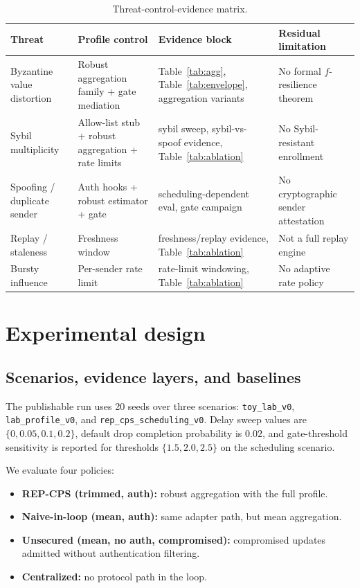 \documentclass[11pt]{article}
\newcommand{\repcps}{REP-CPS}
\newcommand{\code}[1]{\texttt{#1}}
\begin{document}
\begin{table}[H]
\centering
\caption{Threat-control-evidence matrix.}
\label{tab:threats}
\begin{tabularx}{\linewidth}{p{2.5cm}p{3.0cm}p{4.0cm}X}
\toprule
Threat & Profile control & Evidence block & Residual limitation \\
\midrule
Byzantine value distortion & Robust aggregation family + gate mediation & Table~\ref{tab:agg}, Table~\ref{tab:envelope}, aggregation variants & No formal $f$-resilience theorem \\
Sybil multiplicity & Allow-list stub + robust aggregation + rate limits & sybil sweep, sybil-vs-spoof evidence, Table~\ref{tab:ablation} & No Sybil-resistant enrollment \\
Spoofing / duplicate sender & Auth hooks + robust estimator + gate & scheduling-dependent eval, gate campaign & No cryptographic sender attestation \\
Replay / staleness & Freshness window & freshness/replay evidence, Table~\ref{tab:ablation} & Not a full replay engine \\
Bursty influence & Per-sender rate limit & rate-limit windowing, Table~\ref{tab:ablation} & No adaptive rate policy \\
\bottomrule
\end{tabularx}
\end{table}

\section{Experimental design}

\subsection{Scenarios, evidence layers, and baselines}

The publishable run uses 20 seeds over three scenarios: \code{toy\_lab\_v0}, \code{lab\_profile\_v0}, and \code{rep\_cps\_scheduling\_v0}. Delay sweep values are $\{0, 0.05, 0.1, 0.2\}$, default drop completion probability is $0.02$, and gate-threshold sensitivity is reported for thresholds $\{1.5, 2.0, 2.5\}$ on the scheduling scenario.

We evaluate four policies:
\begin{itemize}[leftmargin=1.5em]
    \item \textbf{\repcps{} (trimmed, auth):} robust aggregation with the full profile.
    \item \textbf{Naive-in-loop (mean, auth):} same adapter path, but mean aggregation.
    \item \textbf{Unsecured (mean, no auth, compromised):} compromised updates admitted without authentication filtering.
    \item \textbf{Centralized:} no protocol path in the loop.
\end{itemize}
\end{document}
